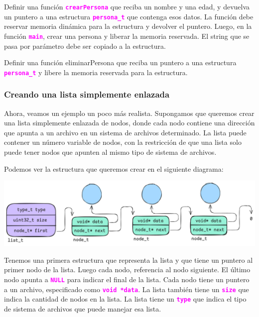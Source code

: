 \documentclass[]{scrartcl}
\newcommand{\hl}[1]{\textcolor{magenta}{\textbf{\texttt{#1}}}}
\begin{document}
\begin{exbox}
Definir una función \hl{crearPersona} que reciba un nombre y una edad, y devuelva un puntero a una estructura \hl{persona\_t} que contenga esos datos. La función debe reservar memoria dinámica para la estructura y devolver el puntero. Luego, en la función \hl{main}, crear una persona y liberar la memoria reservada.
El string que se pasa por parámetro debe ser copiado a la estructura.
\end{exbox}

\begin{exbox}
  Definir una función eliminarPersona que reciba un puntero a una estructura \hl{persona\_t} y libere la memoria reservada para la estructura. 
\end{exbox}

\subsubsection*{Creando una lista simplemente enlazada}

Ahora, veamos un ejemplo un poco más realista. Supongamos que queremos crear una lista simplemente enlazada de nodos, donde cada nodo contiene una dirección que apunta a un archivo en un sistema de archivos determinado. La lista puede contener un número variable de nodos, con la restricción de que una lista solo puede tener nodos que apunten al mismo tipo de sistema de archivos.

Podemos ver la estructura que queremos crear en el siguiente diagrama:

\begin{center}
  \includegraphics[scale=0.2]{./img/linkedlist.png}  
\end{center}

Tenemos una primera estructura que representa la lista y que tiene un puntero al primer nodo de la lista. Luego cada nodo, referencia al nodo siguiente. El último nodo apunta a \hl{NULL} para indicar el final de la lista. Cada nodo tiene un puntero a un archivo, especificado como \hl{void *data}. La lista también tiene un \hl{size} que indica la cantidad de nodos en la lista. La lista tiene un \hl{type} que indica el tipo de sistema de archivos que puede manejar esa lista. 
\end{document}
